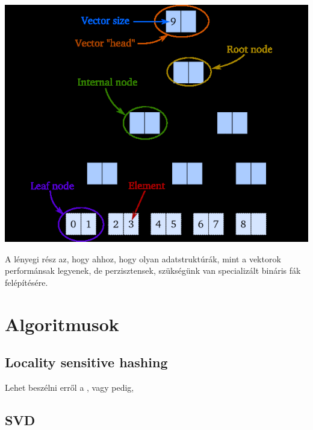 \documentclass[final, 12pt] {ubb_dolgozat}{book}
\begin{document}
\begin{center}
\includegraphics[width=.9\linewidth]{images/perzisztens-vektor.jpg}
\end{center}

A lényegi rész az, hogy ahhoz, hogy olyan adatstruktúrák, mint a vektorok performánsak legyenek, de perzisztensek, szükségünk van
specializált bináris fák felépítésére.
\chapter{Algoritmusok}
\label{sec:org32b5602}
\section{Locality sensitive hashing}
\label{sec:org54a0d69}
Lehet beszélni erről a \citep{charikarSimilarityEstimationTechniques}, vagy pedig,

\section{SVD}
\label{sec:org9b2edd9}
\citep{brandFastOnlineSVD2003}



\end{document}
